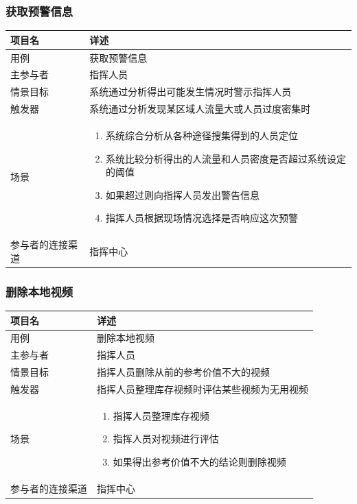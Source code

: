\documentclass{ctexrep}
\begin{document}
\subsubsection{获取预警信息}
\begin{longtable}{p{2cm} | p{10cm}}
\hline
项目名 & 详述 \\
\hline
\hline
用例 & 获取预警信息\\
\hline
主参与者 & 指挥人员 \\
\hline
情景目标 &  系统通过分析得出可能发生情况时警示指挥人员\\
\hline
触发器 &  系统通过分析发现某区域人流量大或人员过度密集时\\
\hline
场景 & \begin{enumerate}
	\item 系统综合分析从各种途径搜集得到的人员定位
	\item 系统比较分析得出的人流量和人员密度是否超过系统设定的阈值
	\item 如果超过则向指挥人员发出警告信息
	\item 指挥人员根据现场情况选择是否响应这次预警
\end{enumerate} \\
\hline
参与者的连接渠道 & 指挥中心 \\
\hline
\end{longtable}

\subsubsection{删除本地视频}
\begin{longtable}{p{2cm} | p{10cm}}
\hline
项目名 & 详述 \\
\hline
\hline
用例 & 删除本地视频\\
\hline
主参与者 & 指挥人员 \\
\hline
情景目标 &  指挥人员删除从前的参考价值不大的视频\\
\hline
触发器 &  指挥人员整理库存视频时评估某些视频为无用视频\\
\hline
场景 & \begin{enumerate}
	\item 指挥人员整理库存视频
	\item 指挥人员对视频进行评估
	\item 如果得出参考价值不大的结论则删除视频
\end{enumerate} \\
\hline
参与者的连接渠道 & 指挥中心 \\
\hline
\end{longtable}
\end{document}
